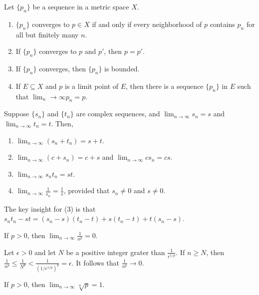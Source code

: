 \documentclass{jacky}
\begin{document}
\begin{prop}
  Let $\{p_n\}$ be a sequence in a metric space $X$.
  \begin{enumerate}
    \item $\{p_n\}$ converges to $p\in X$ if and only if every neighborhood of
      $p$ contains $p_n$ for all but finitely many $n$.
    \item If $\{p_n\}$ converges to $p$ and $p'$, then $p=p'$.
    \item If $\{p_n\}$ converges, then $\{p_n\}$ is bounded.
    \item If $E\subseteq X$ and $p$ is a limit point of $E$, then there is a
      sequence $\{p_n\}$ in $E$ such that $\lim_n\to\infty p_n=p$.
  \end{enumerate}
\end{prop}

\begin{prop}
  Suppose $\{s_n\}$ and $\{t_n\}$ are complex sequences, and
  $\lim_{n\to\infty}s_n=s$ and $\lim_{n\to\infty}t_n=t$. Then,
  \begin{enumerate}
    \item $\lim_{n\to\infty}(s_n+t_n)=s+t$.
    \item $\lim_{n\to\infty}(c+s_n)=c+s$ and $\lim_{n\to\infty}cs_n=cs$.
    \item $\lim_{n\to\infty}s_nt_n=st$.
    \item $\lim_{n\to\infty}\frac{1}{s_n}=\frac{1}{s}$, provided that
      $s_n\neq0$ and $s\neq0$.
  \end{enumerate}
\end{prop}

\begin{pfi}
  The key insight for (3) is that $s_nt_n-st=(s_n-s)(t_n-t)+s(t_n-t)+t(s_n-s)$.
\end{pfi}

\begin{prop}
  If $p>0$, then $\lim_{n\to\infty}\frac{1}{n^p}=0$.
\end{prop}

\begin{pf}
  Let $\epsilon>0$ and let $N$ be a positive integer grater than
  $\frac{1}{\epsilon^{1/p}}$. If $n\ge N$, then
  $\frac{1}{n^p}\le\frac{1}{N^p}<\frac{1}{(1/\epsilon^{1/p})^p}=\epsilon$. It
  follows that $\frac{1}{n^p}\to0$.
\end{pf}

\begin{prop}
  If $p>0$, then $\lim_{n\to\infty}\sqrt[n]{p}=1$.
\end{prop}
\end{document}
